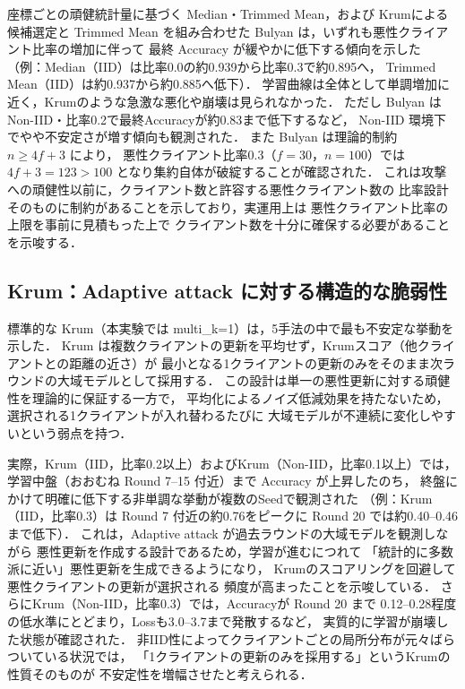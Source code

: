 \documentclass[a4j,twocolumn,dvipdfmx]{jsarticle}
\begin{document}
座標ごとの頑健統計量に基づく Median・Trimmed Mean，および Krumによる候補選定と
Trimmed Mean を組み合わせた Bulyan は，いずれも悪性クライアント比率の増加に伴って
最終 Accuracy が緩やかに低下する傾向を示した
（例：Median（IID）は比率0.0の約0.939から比率0.3で約0.895へ，
Trimmed Mean（IID）は約0.937から約0.885へ低下）．
学習曲線は全体として単調増加に近く，Krumのような急激な悪化や崩壊は見られなかった．
ただし Bulyan は Non-IID・比率0.2で最終Accuracyが約0.83まで低下するなど，
Non-IID 環境下でやや不安定さが増す傾向も観測された．
また Bulyan は理論的制約 $n \geq 4f+3$ により，
悪性クライアント比率0.3（$f=30$，$n=100$）では
$4f+3=123>100$ となり集約自体が破綻することが確認された．
これは攻撃への頑健性以前に，クライアント数と許容する悪性クライアント数の
比率設計そのものに制約があることを示しており，実運用上は
悪性クライアント比率の上限を事前に見積もった上で
クライアント数を十分に確保する必要があることを示唆する．

\subsection{Krum：Adaptive attack に対する構造的な脆弱性}

標準的な Krum（本実験では multi\_k=1）は，5手法の中で最も不安定な挙動を示した．
Krum は複数クライアントの更新を平均せず，Krumスコア（他クライアントとの距離の近さ）が
最小となる1クライアントの更新のみをそのまま次ラウンドの大域モデルとして採用する．
この設計は単一の悪性更新に対する頑健性を理論的に保証する一方で，
平均化によるノイズ低減効果を持たないため，選択される1クライアントが入れ替わるたびに
大域モデルが不連続に変化しやすいという弱点を持つ．

実際，Krum（IID，比率0.2以上）およびKrum（Non-IID，比率0.1以上）では，
学習中盤（おおむね Round 7--15 付近）まで Accuracy が上昇したのち，
終盤にかけて明確に低下する非単調な挙動が複数のSeedで観測された
（例：Krum（IID，比率0.3）は Round 7 付近の約0.76をピークに
Round 20 では約0.40--0.46まで低下）．
これは，Adaptive attack が過去ラウンドの大域モデルを観測しながら
悪性更新を作成する設計であるため，学習が進むにつれて
「統計的に多数派に近い」悪性更新を生成できるようになり，
Krumのスコアリングを回避して悪性クライアントの更新が選択される
頻度が高まったことを示唆している．
さらにKrum（Non-IID，比率0.3）では，Accuracyが Round 20 まで
0.12--0.28程度の低水準にとどまり，Lossも3.0--3.7まで発散するなど，
実質的に学習が崩壊した状態が確認された．
非IID性によってクライアントごとの局所分布が元々ばらついている状況では，
「1クライアントの更新のみを採用する」というKrumの性質そのものが
不安定性を増幅させたと考えられる．
\end{document}
